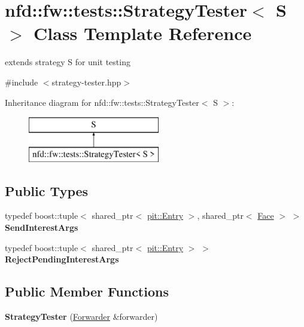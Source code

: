 \hypertarget{classnfd_1_1fw_1_1tests_1_1StrategyTester}{}\section{nfd\+:\+:fw\+:\+:tests\+:\+:Strategy\+Tester$<$ S $>$ Class Template Reference}
\label{classnfd_1_1fw_1_1tests_1_1StrategyTester}


extends strategy S for unit testing  




{\ttfamily \#include $<$strategy-\/tester.\+hpp$>$}

Inheritance diagram for nfd\+:\+:fw\+:\+:tests\+:\+:Strategy\+Tester$<$ S $>$\+:\begin{figure}[H]
\begin{center}
\leavevmode
\includegraphics[height=2.000000cm]{classnfd_1_1fw_1_1tests_1_1StrategyTester}
\end{center}
\end{figure}
\subsection*{Public Types}
\begin{DoxyCompactItemize}
\item 
typedef boost\+::tuple$<$ shared\+\_\+ptr$<$ \hyperlink{classnfd_1_1pit_1_1Entry}{pit\+::\+Entry} $>$, shared\+\_\+ptr$<$ \hyperlink{classnfd_1_1Face}{Face} $>$ $>$ {\bfseries Send\+Interest\+Args}\hypertarget{classnfd_1_1fw_1_1tests_1_1StrategyTester_afce84a1c32f4645032158d94f3c659b3}{}\label{classnfd_1_1fw_1_1tests_1_1StrategyTester_afce84a1c32f4645032158d94f3c659b3}

\item 
typedef boost\+::tuple$<$ shared\+\_\+ptr$<$ \hyperlink{classnfd_1_1pit_1_1Entry}{pit\+::\+Entry} $>$ $>$ {\bfseries Reject\+Pending\+Interest\+Args}\hypertarget{classnfd_1_1fw_1_1tests_1_1StrategyTester_afb8db1e578f2e18c6217a5e00e0332a7}{}\label{classnfd_1_1fw_1_1tests_1_1StrategyTester_afb8db1e578f2e18c6217a5e00e0332a7}

\end{DoxyCompactItemize}
\subsection*{Public Member Functions}
\begin{DoxyCompactItemize}
\item 
{\bfseries Strategy\+Tester} (\hyperlink{classnfd_1_1Forwarder}{Forwarder} \&forwarder)\hypertarget{classnfd_1_1fw_1_1tests_1_1StrategyTester_aa973e5f40f759e372b4c6e6a505698c3}{}\label{classnfd_1_1fw_1_1tests_1_1StrategyTester_aa973e5f40f759e372b4c6e6a505698c3}

\end{DoxyCompactItemize}
